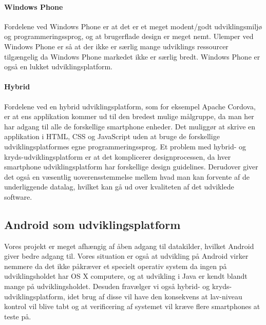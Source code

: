 \paragraph{Windows Phone}
Fordelene ved Windows Phone er at det er et meget modent/godt udviklingsmiljø og programmeringssprog, og at brugerflade design er meget nemt. 
Ulemper ved Windows Phone er så at der ikke er særlig mange udviklings ressourcer tilgængelig da Windows Phone markedet ikke er særlig bredt.
Windows Phone er også en lukket udviklingsplatform.

\paragraph{Hybrid}
Fordelene ved en hybrid udviklingsplatform, som for eksempel Apache Cordova, er at ens applikation kommer ud til den bredest mulige målgruppe, da man her har adgang til alle de forskellige smartphone enheder.
Det muliggør at skrive en applikation i HTML, CSS og JavaScript uden at bruge de forskellige udviklingsplatformes egne programmeringssprog.
Et problem med hybrid- og kryds-udviklingsplatform er at det komplicerer designprocessen, da hver smartphone udviklingsplatform har forskellige design guidelines.
Derudover giver det også en væsentlig uoverensstemmelse mellem hvad man kan forvente af de underliggende datalag, hvilket kan gå ud over kvaliteten af det udviklede software.

\subsection{Android som udviklingsplatform}
Vores projekt er meget afhængig af åben adgang til datakilder, hvilket Android giver bedre adgang til.
Vores situation er også at udvikling på Android virker nemmere da det ikke påkræver et specielt operativ system da ingen på udviklingsholdet har OS X computere, og at udvikling i Java er kendt blandt mange på udviklingsholdet.
Desuden fravælger vi også hybrid- og kryds-udviklingsplatform, idet brug af disse vil have den konsekvens at lav-niveau kontrol vil blive tabt og at verificering af systemet vil kræve flere smartphones at teste på.
